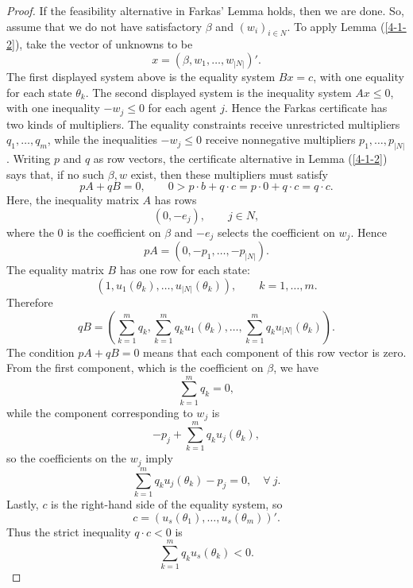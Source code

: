 \begin{proof}
	If the feasibility alternative in Farkas' Lemma holds, then we are done. So, assume that we do not have satisfactory $\beta$ and $(w_i)_{i \in N}$.
	To apply Lemma (\ref{4-1-2}), take the vector of unknowns to be
	\[
		x = \left(\beta,w_1,\ldots,w_{\left| N \right|}\right)'.
	\]
	The first displayed system above is the equality system $Bx=c$, with one equality for each state $\theta_k$. The second displayed system is the inequality system $Ax \le 0$, with one inequality $-w_j \le 0$ for each agent $j$.
	Hence the Farkas certificate has two kinds of multipliers. The equality constraints receive unrestricted multipliers $q_1,\ldots,q_m$, while the inequalities $-w_j \le 0$ receive nonnegative multipliers $p_1,\ldots,p_{\left| N \right|}$.
	Writing $p$ and $q$ as row vectors, the certificate alternative in Lemma (\ref{4-1-2}) says that, if no such $\beta,w$ exist, then these multipliers must satisfy
	\[
		pA + qB = 0, \qquad 0 > p \cdot b + q \cdot c = p \cdot 0 + q\cdot c = q \cdot c
	.\]
	Here, the inequality matrix $A$ has rows
	\[
		\left(0, -e_j\right), \qquad j \in N,
	\]
	where the $0$ is the coefficient on $\beta$ and $-e_j$ selects the coefficient on $w_j$. Hence
	\[
		pA = \left(0,-p_1,\ldots,-p_{\left| N \right|}\right).
	\]
	The equality matrix $B$ has one row for each state:
	\[
		\left(1,u_1(\theta_k),\ldots,u_{\left| N \right|}(\theta_k)\right), \qquad k=1,\ldots,m.
	\]
	Therefore
	\[
		qB =
		\left(
			\sum\limits_{k=1}^{m} q_k,
			\sum\limits_{k=1}^{m} q_k u_1(\theta_k),
			\ldots,
			\sum\limits_{k=1}^{m} q_k u_{\left| N \right|}(\theta_k)
		\right).
	\]
	The condition $pA+qB=0$ means that each component of this row vector is zero. From the first component, which is the coefficient on $\beta$, we have
	\begin{equation}
		\sum\limits_{k=1}^{m} q_k = 0 \label{eq:4-1-1}
	,\end{equation}
	while the component corresponding to $w_j$ is
	\[
		-p_j + \sum\limits_{k=1}^{m} q_k u_j(\theta_k),
	\]
	so the coefficients on the $w_j$ imply
	\begin{equation}
		\sum\limits_{k=1}^{m} q_k u_j(\theta_k)-p_j = 0, \quad \forall\ j \label{eq:4-1-2}
	.\end{equation}
	Lastly, $c$ is the right-hand side of the equality system, so
	\[
		c =
		\left(u_s(\theta_1),\ldots,u_s(\theta_m)\right)'.
	\]
	Thus the strict inequality $q \cdot c < 0$ is
	\begin{equation}
		\sum\limits_{k=1}^{m} q_k u_s(\theta_k) < 0 \label{eq:4-1-3}
	.\end{equation}


\end{proof}
